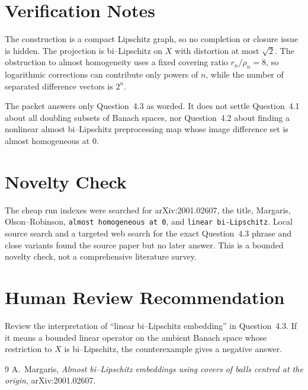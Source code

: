 \documentclass[11pt]{article}
\begin{document}
\section*{Verification Notes}

The construction is a compact Lipschitz graph, so no completion or closure
issue is hidden. The projection is bi--Lipschitz on \(X\) with distortion at
most \(\sqrt2\). The obstruction to almost homogeneity uses a fixed covering
ratio \(r_n/\rho_n=8\), so logarithmic corrections can contribute only powers
of \(n\), while the number of separated difference vectors is \(2^n\).

The packet answers only Question~4.3 as worded. It does not settle
Question~4.1 about all doubling subsets of Banach spaces, nor Question~4.2
about finding a nonlinear almost bi--Lipschitz preprocessing map whose image
difference set is almost homogeneous at \(0\).

\section*{Novelty Check}

The cheap run indexes were searched for arXiv:2001.02607, the title, Margaris,
Olson--Robinson, \texttt{almost homogeneous at 0}, and
\texttt{linear bi-Lipschitz}. Local source search and a targeted web search for
the exact Question~4.3 phrase and close variants found the source paper but no
later answer. This is a bounded novelty check, not a comprehensive literature
survey.

\section*{Human Review Recommendation}

Review the interpretation of ``linear bi--Lipschitz embedding'' in
Question~4.3. If it means a bounded linear operator on the ambient Banach space
whose restriction to \(X\) is bi--Lipschitz, the counterexample gives a
negative answer.

\begin{thebibliography}{9}
A.~Margaris,
\emph{Almost bi--Lipschitz embeddings using covers of balls centred at the
origin},
arXiv:2001.02607.
\end{thebibliography}
\end{document}
